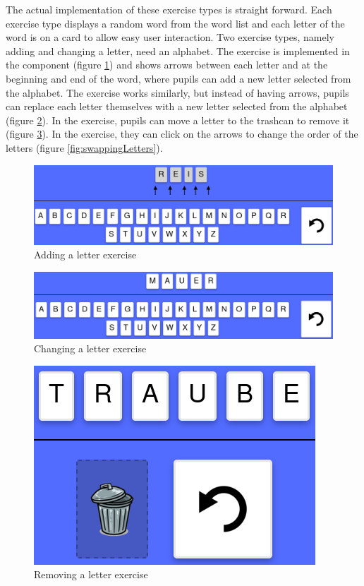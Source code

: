 The actual implementation of these exercise types is straight forward. Each exercise type displays a random word from the word list and each letter of the word is on a card to allow easy user interaction. Two exercise types, namely adding and changing a letter, need an alphabet. The  exercise is implemented in the  component (figure \ref{fig:addingLetter}) and shows arrows between each letter and at the beginning and end of the word, where pupils can add a new letter selected from the alphabet. The  exercise works similarly, but instead of having arrows, pupils can replace each letter themselves with a new letter selected from the alphabet (figure \ref{fig:changingLetter}). In the  exercise, pupils can move a letter to the trashcan to remove it (figure \ref{fig:removingLetter}). In the  exercise, they can click on the arrows to change the order of the letters (figure \ref{fig:swappingLetters}).

\begin{figure} 
  \centering
  \includegraphics[width=1.0 \columnwidth]{figures/words_add.png}
  \caption{Adding a letter exercise} 
  \label{fig:addingLetter} 
\end{figure}

\begin{figure} 
  \centering
  \includegraphics[width=1.0 \columnwidth]{figures/words_change.png}
  \caption{Changing a letter exercise} 
  \label{fig:changingLetter} 
\end{figure}

\begin{figure} 
  \centering
  \includegraphics[width=0.3 \columnwidth]{figures/words_remove.png}
  \caption{Removing a letter exercise} 
  \label{fig:removingLetter} 
\end{figure}


